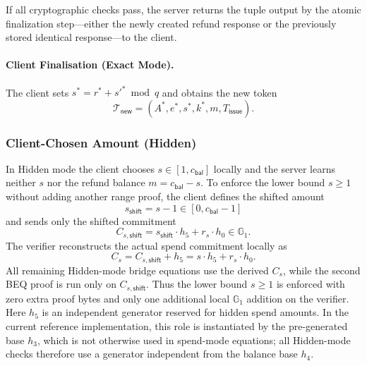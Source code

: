 \documentclass[11pt]{article}
\theoremstyle{definitionstyle}
\theoremstyle{plain}
\begin{document}
If all cryptographic checks pass, the server returns the tuple output by the atomic finalization step---either the newly created refund response or the previously stored identical response---to the client.

\paragraph{Client Finalisation (Exact Mode).}
The client sets $s^* = r^* + s'^* \bmod q$ and obtains the new token
\[
\mathcal{T}_{\mathsf{new}} = (A^*, e^*, s^*, k^*, m, T_{\mathsf{issue}}).
\]

\subsubsection{Client-Chosen Amount (Hidden)}
\label{sec:spend-hidden}

In Hidden mode the client chooses $s \in [1,c_{\mathsf{bal}}]$ locally and the server learns neither $s$ nor the refund balance $m = c_{\mathsf{bal}} - s$. To enforce the lower bound $s \ge 1$ without adding another range proof, the client defines the shifted amount
\[
s_{\mathsf{shift}} = s - 1 \in [0, c_{\mathsf{bal}}-1]
\]
and sends only the shifted commitment
\[
C_{s,\mathsf{shift}} = s_{\mathsf{shift}} \cdot h_5 + r_s \cdot h_0 \in \mathbb{G}_1.
\]
The verifier reconstructs the actual spend commitment locally as
\[
C_s = C_{s,\mathsf{shift}} + h_5 = s \cdot h_5 + r_s \cdot h_0.
\]
All remaining Hidden-mode bridge equations use the derived $C_s$, while the second BEQ proof is run only on $C_{s,\mathsf{shift}}$. Thus the lower bound $s \ge 1$ is enforced with zero extra proof bytes and only one additional local $\mathbb{G}_1$ addition on the verifier. Here $h_5$ is an independent generator reserved for hidden spend amounts. In the current reference implementation, this role is instantiated by the pre-generated base $h_3$, which is not otherwise used in spend-mode equations; all Hidden-mode checks therefore use a generator independent from the balance base $h_4$.
\end{document}
